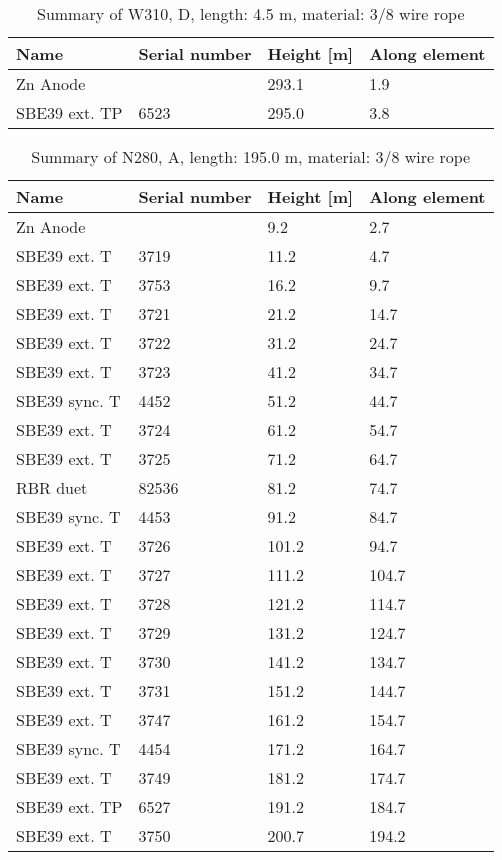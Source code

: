 \documentclass{article}
\begin{document}
\begin{table}[!htbp]
\centering
\caption{Summary of W310, D, length: 4.5 m, material: 3/8 wire rope}
\begin{tabular}{llll}
\toprule
Name & Serial number & Height [m] & Along element \\
\midrule
Zn Anode &  & 293.1 & 1.9 \\
SBE39 ext. TP & 6523 & 295.0 & 3.8 \\
\bottomrule
\end{tabular}
\end{table}

\begin{table}[!htbp]
\centering
\caption{Summary of N280, A, length: 195.0 m, material: 3/8 wire rope}
\begin{tabular}{llll}
\toprule
Name & Serial number & Height [m] & Along element \\
\midrule
Zn Anode &  & 9.2 & 2.7 \\
SBE39 ext. T & 3719 & 11.2 & 4.7 \\
SBE39 ext. T & 3753 & 16.2 & 9.7 \\
SBE39 ext. T & 3721 & 21.2 & 14.7 \\
SBE39 ext. T & 3722 & 31.2 & 24.7 \\
SBE39 ext. T & 3723 & 41.2 & 34.7 \\
SBE39 sync. T & 4452 & 51.2 & 44.7 \\
SBE39 ext. T & 3724 & 61.2 & 54.7 \\
SBE39 ext. T & 3725 & 71.2 & 64.7 \\
RBR duet & 82536 & 81.2 & 74.7 \\
SBE39 sync. T & 4453 & 91.2 & 84.7 \\
SBE39 ext. T & 3726 & 101.2 & 94.7 \\
SBE39 ext. T & 3727 & 111.2 & 104.7 \\
SBE39 ext. T & 3728 & 121.2 & 114.7 \\
SBE39 ext. T & 3729 & 131.2 & 124.7 \\
SBE39 ext. T & 3730 & 141.2 & 134.7 \\
SBE39 ext. T & 3731 & 151.2 & 144.7 \\
SBE39 ext. T & 3747 & 161.2 & 154.7 \\
SBE39 sync. T & 4454 & 171.2 & 164.7 \\
SBE39 ext. T & 3749 & 181.2 & 174.7 \\
SBE39 ext. TP & 6527 & 191.2 & 184.7 \\
SBE39 ext. T & 3750 & 200.7 & 194.2 \\
\bottomrule
\end{tabular}
\end{table}
\end{document}
